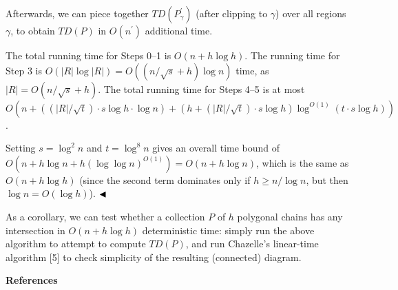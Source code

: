 \documentclass[10pt,a4paper]{article}
\begin{document}
\begin{enumerate}
\par
\par
Afterwards, we can piece together $\textit{TD}(P^{\prime}_{\gamma})$ (after clipping to $\gamma$) over all regions $\gamma$, to obtain $\textit{TD}(P)$ in $O(n^{\prime})$ additional time.
\par
\par
\end{enumerate}
\par
The total running time for Steps 0–1 is $O(n+h\log h)$. The running time for Step 3 is $O(|R|\log|R|)=O((n/\sqrt{s}+h)\log n)$ time, as $|R|=O(n/\sqrt{s}+h)$. The total running time for Steps 4–5 is at most $O(n+((|R|/\sqrt{t})\cdot s\log h\cdot\log n)+(h+(|R|/\sqrt{t})\cdot s\log h)%
\log^{O(1)}(t\cdot s\log h))$.
\par
\par
Setting $s=\log^{2}n$ and $t=\log^{8}n$ gives an overall time bound of $O(n+h\log n+h(\log\log n)^{O(1)})=O(n+h\log n)$, which is the same as $O(n+h\log h)$ (since the second term dominates only if $h\geq n/\log n$, but then $\log n=O(\log h)$). $\hfill\blacktriangleleft$
\par
\par
As a corollary, we can test whether a collection $P$ of $h$ polygonal chains has any intersection in $O(n+h\log h)$ deterministic time: simply run the above algorithm to attempt to compute $\textit{TD}(P)$, and run Chazelle’s linear-time algorithm [5] to check simplicity of the resulting (connected) diagram.
\par
\par
\par\medskip\noindent\textbf{References}\par
\end{document}
